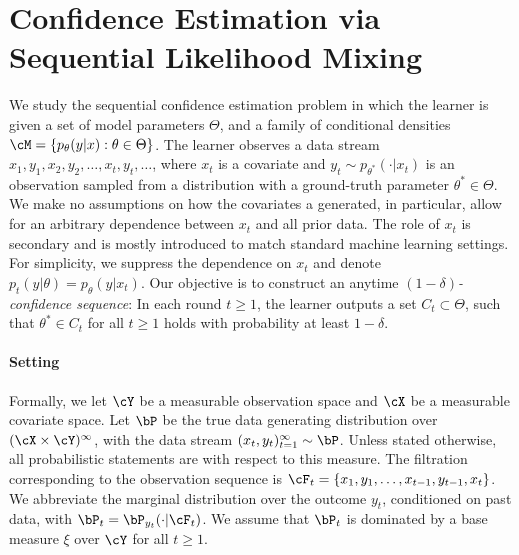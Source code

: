 \section{Confidence Estimation via Sequential Likelihood Mixing}

We study the sequential confidence estimation problem in which the learner is given a set of model parameters $\Theta$, and a family of conditional densities $\cM = \{p_\theta(y|x): \theta \in \Theta\}$. 
The learner observes a data stream $x_1, y_1, x_2, y_2, \dots, x_t, y_t, \dots$, where $x_t$ is a covariate and $y_t \sim p_{\theta^*}(\cdot|x_t)$ is an observation sampled from a distribution with a ground-truth parameter $\theta^* \in \Theta$. We make no assumptions on how the covariates a generated, in particular, allow for an arbitrary dependence between $x_t$ and all prior data. The role of $x_t$ is secondary and is mostly introduced to match standard machine learning settings. For simplicity, we suppress the dependence on $x_t$ and denote $p_t(y|\theta) = p_{\theta}(y|x_t)$.
Our objective is to construct an anytime \emph{$(1-\delta)$-confidence sequence}: In each round $t \geq 1$, the learner outputs a set $C_t \subset \Theta$, such that $\theta^* \in C_t$ for all $t \geq 1$ holds with probability at least $1-\delta$.

\paragraph{Setting} Formally, we let $\cY$ be a measurable observation space and $\cX$ be a measurable covariate space. Let $\bP$ be the true data generating distribution over $(\cX \times \cY)^\infty$, with the data stream $({x_t, y_t})_{t=1}^\infty \sim \bP$. Unless stated otherwise, all probabilistic statements are with respect to this measure. The filtration corresponding to the observation sequence is $\cF_t = \{x_1,y_1, \dots ,x_{t-1},y_{t-1}, x_t\}$. We abbreviate the marginal distribution over the outcome $y_t$, conditioned on past data, with $\bP_t = \bP_{y_t}(\cdot | \cF_t)$. We assume that $\bP_t$ is dominated by a base measure $\xi$ over $\cY$ for all $t \geq 1$. 


